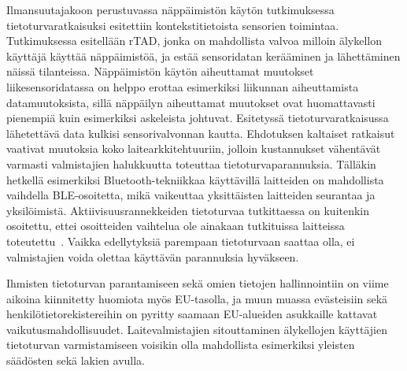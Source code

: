 \documentclass[finnish]{tktltiki2}
\theoremstyle{definition}
\theoremstyle{remark}
\begin{document}
Ilmansuutajakoon perustuvassa näppäimistön käytön tutkimuksessa~\cite{maiti} tietoturvaratkaisuksi esitettiin kontekstitietoista sensorien toimintaa. Tutkimuksessa esitellään rTAD, jonka on mahdollista valvoa milloin älykellon käyttäjä käyttää näppäimistöä, ja estää sensoridatan kerääminen ja lähettäminen näissä tilanteissa. Näppäimistön käytön aiheuttamat muutokset liikesensoridatassa on helppo erottaa esimerkiksi liikunnan aiheuttamista datamuutoksista, sillä näppäilyn aiheuttamat muutokset ovat huomattavasti pienempiä kuin esimerkiksi askeleista johtuvat. Esitetyssä tietoturvaratkaisussa lähetettävä data kulkisi sensorivalvonnan kautta. Ehdotuksen kaltaiset ratkaisut vaativat muutoksia koko laitearkkitehtuuriin, jolloin kustannukset vähentävät varmasti valmistajien halukkuutta toteuttaa tietoturvaparannuksia. Tälläkin hetkellä esimerkiksi Bluetooth-tekniikkaa käyttävillä laitteiden on mahdollista vaihdella BLE-osoitetta, mikä vaikeuttaa yksittäisten laitteiden seurantaa ja yksilöimistä. Aktiivisuusrannekkeiden tietoturvaa tutkittaessa on kuitenkin osoitettu, ettei osoitteiden vaihtelua ole ainakaan tutkituissa laitteissa toteutettu~\cite{das}. Vaikka edellytyksiä parempaan tietoturvaan saattaa olla, ei valmistajien voida olettaa käyttävän parannuksia hyväkseen.

Ihmisten tietoturvan parantamiseen sekä omien tietojen hallinnointiin on viime aikoina kiinnitetty huomiota myös EU-tasolla, ja muun muassa evästeisiin sekä henkilötietorekistereihin on pyritty saamaan EU-alueiden asukkaille kattavat vaikutusmahdollisuudet. Laitevalmistajien sitouttaminen älykellojen käyttäjien tietoturvan varmistamiseen voisikin olla mahdollista esimerkiksi yleisten säädösten sekä lakien avulla.



\end{document}
